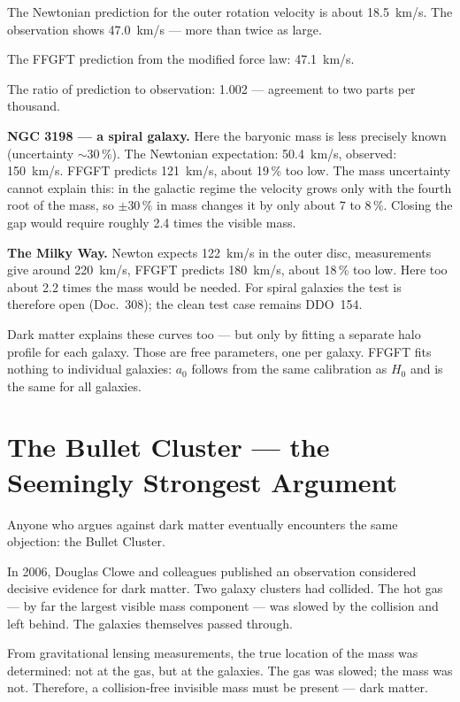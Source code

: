 \documentclass[11pt,oneside]{book}
\begin{document}
The Newtonian prediction for the outer rotation velocity
is about 18.5~km/s. The observation shows 47.0~km/s —
more than twice as large.

The FFGFT prediction from the modified force law: 47.1~km/s.

The ratio of prediction to observation: 1.002 — agreement
to two parts per thousand.

\textbf{NGC 3198 — a spiral galaxy.}
Here the baryonic mass is less precisely known (uncertainty
$\sim 30\,\%$). The Newtonian expectation: 50.4~km/s,
observed: 150~km/s. FFGFT predicts 121~km/s, about 19\,\%
too low. The mass uncertainty cannot explain this: in the
galactic regime the velocity grows only with the fourth root
of the mass, so $\pm30\,\%$ in mass changes it by only about
$7$ to $8\,\%$. Closing the gap would require roughly 2.4 times
the visible mass.

\textbf{The Milky Way.}
Newton expects 122~km/s in the outer disc, measurements
give around 220~km/s, FFGFT predicts 180~km/s, about 18\,\%
too low. Here too about 2.2 times the mass would be needed.
For spiral galaxies the test is therefore open (Doc.~308);
the clean test case remains DDO~154.

\medskip
Dark matter explains these curves too — but only by fitting
a separate halo profile for each galaxy. Those are free
parameters, one per galaxy. FFGFT fits nothing to
individual galaxies: $a_0$ follows from the same calibration
as $H_0$ and is the same for all galaxies.

\chapter{The Bullet Cluster — the Seemingly Strongest Argument}

Anyone who argues against dark matter eventually encounters
the same objection: the Bullet Cluster.

In 2006, Douglas Clowe and colleagues published an
observation considered decisive evidence for dark matter.
Two galaxy clusters had collided. The hot gas — by far the
largest visible mass component — was slowed by the collision
and left behind. The galaxies themselves passed through.

From gravitational lensing measurements, the true location
of the mass was determined: not at the gas, but at the
galaxies. The gas was slowed; the mass was not. Therefore,
a collision-free invisible mass must be present — dark matter.
\end{document}
